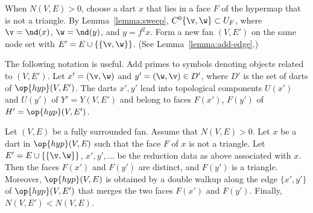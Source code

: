 

\begin{remark}\label{remark:reduction}
  When $N(V,E)>0$, choose a dart $x$ that lies in a face $F$ of the
  hypermap that is not a triangle.  By Lemma~\ref{lemma:sweep},
  $C^0\{\v,\w\}\subset U_F$, where $\v=\nd(x)$, $\w=\nd(y)$, and
  $y=f^2 x$.  Form a new fan $(V,E')$ on the same node set with $E' =
  E\cup \{\{\v,\w\}\}$.  (See Lemma~\ref{lemma:add-edge}.)

The following notation is useful.  Add primes to symbols
denoting objects related to $(V,E')$.
Let $x'=(\v,\w)$ and $y'=(\w,\v)\in D'$, where $D'$ is the set of darts of $\op{hyp}(V,E')$.
The darts $x',y'$ lead into topological components
$U(x')$ and $U(y')$ of $Y'=Y(V,E')$ and belong to faces $F(x')$,
$F(y')$ of $H'=\op{hyp}(V,E')$.
\end{remark}

\begin{lemma}[]\label{lemma:lessN}
  Let $(V,E)$ be a fully surrounded fan.  Assume that $N(V,E)>0$.  Let
  $x$ be a dart in $\op{hyp}(V,E)$ such that the face $F$ of $x$ is
  not a triangle.  Let $E'=E\cup \{\{\v,\w\}\}$, $x',y',\ldots$ be the reduction data
  as above associated with $x$.  Then the faces $F(x')$ and $F(y')$ are distinct, and
  $F(y')$ is a
  triangle. Moreover, $\op{hyp}(V,E)$ is obtained by a double walkup along the
  edge $\{x',y'\}$ of $\op{hyp}(V,E')$ that merges the two faces $F(x')$ and $F(y')$.
  Finally, $N(V,E')<N(V,E)$.
\end{lemma}


